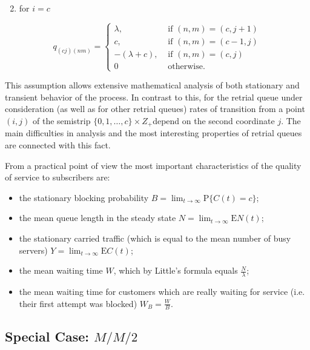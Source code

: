 \documentclass[10pt]{article}
\begin{document}
\begin{enumerate}
  \setcounter{enumi}{1}
  \item for $i=c$
\end{enumerate}

$$
q_{(c j)(n m)}=\left\{\begin{array}{cl}
\lambda, & \text { if }(n, m)=(c, j+1) \\
c, & \text { if }(n, m)=(c-1, j) \\
-(\lambda+c), & \text { if }(n, m)=(c, j) \\
0 & \text { otherwise. }
\end{array}\right.
$$


This assumption allows extensive mathematical analysis of both stationary and transient behavior of the process. In contrast to this, for the retrial queue under consideration (as well as for other retrial queues) rates of transition from a point $(i, j)$ of the semistrip $\{0,1, \ldots, c\} \times Z_{+}$depend on the second coordinate $j$. The main difficulties in analysis and the most interesting properties of retrial queues are connected with this fact.

From a practical point of view the most important characteristics of the quality of service to subscribers are:

\begin{itemize}
  \item the stationary blocking probability $B=\lim _{t \rightarrow \infty} \mathrm{P}\{C(t)=c\}$;

  \item the mean queue length in the steady state $N=\lim _{t \rightarrow \infty} \mathrm{E} N(t)$;

  \item the stationary carried traffic (which is equal to the mean number of busy servers) $Y=\lim _{t \rightarrow \infty} \mathrm{E} C(t)$;

  \item the mean waiting time $W$, which by Little's formula equals $\frac{N}{\lambda}$;

  \item the mean waiting time for customers which are really waiting for service (i.e. their first attempt was blocked) $W_{B}=\frac{W}{B}$.

\end{itemize}

\subsection{Special Case: $M/M/2$}
\end{document}
